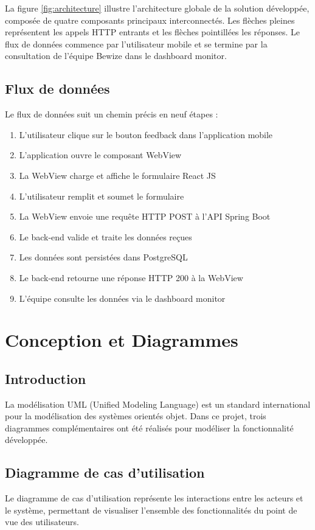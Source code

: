 La figure \ref{fig:architecture} illustre l'architecture globale de la 
solution développée, composée de quatre composants principaux interconnectés. 
Les flèches pleines représentent les appels HTTP entrants et les flèches 
pointillées les réponses. Le flux de données commence par l'utilisateur 
mobile et se termine par la consultation de l'équipe Bewize dans le 
dashboard monitor.

\subsection{Flux de données}
Le flux de données suit un chemin précis en neuf étapes :
\begin{enumerate}
    \item L'utilisateur clique sur le bouton feedback dans l'application mobile
    \item L'application ouvre le composant WebView
    \item La WebView charge et affiche le formulaire React JS
    \item L'utilisateur remplit et soumet le formulaire
    \item La WebView envoie une requête HTTP POST à l'API Spring Boot
    \item Le back-end valide et traite les données reçues
    \item Les données sont persistées dans PostgreSQL
    \item Le back-end retourne une réponse HTTP 200 à la WebView
    \item L'équipe consulte les données via le dashboard monitor
\end{enumerate}

\section{Conception et Diagrammes}

\subsection{Introduction}
La modélisation UML (Unified Modeling Language) est un standard 
international pour la modélisation des systèmes orientés objet. 
Dans ce projet, trois diagrammes complémentaires ont été réalisés 
pour modéliser la fonctionnalité développée.

\subsection{Diagramme de cas d'utilisation}
Le diagramme de cas d'utilisation représente les interactions entre 
les acteurs et le système, permettant de visualiser l'ensemble des 
fonctionnalités du point de vue des utilisateurs.

